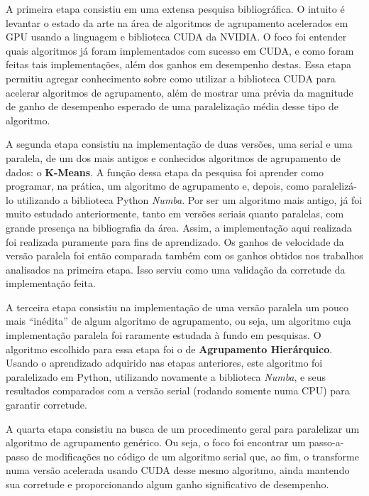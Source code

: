 \documentclass[12pt, %
openright, 
oneside, %
a4paper,    %
brazil]{facom-ufu-abntex2}
\begin{document}
A primeira etapa consistiu em uma extensa pesquisa bibliográfica. O intuito é levantar o estado da arte na área de algoritmos de agrupamento acelerados em GPU usando a linguagem e biblioteca CUDA da NVIDIA. O foco foi entender quais algoritmos já foram implementados com sucesso em CUDA, e como foram feitas tais implementações, além dos ganhos em desempenho destas. Essa etapa permitiu agregar conhecimento sobre como utilizar a biblioteca CUDA para acelerar algoritmos de agrupamento, além de mostrar uma prévia da magnitude de ganho de desempenho esperado de uma paralelização média desse tipo de algoritmo.

A segunda etapa consistiu na implementação de duas versões, uma serial e uma paralela, de um dos mais antigos e conhecidos algoritmos de agrupamento de dados: o \textbf{K-Means}. A função dessa etapa da pesquisa foi aprender como programar, na prática, um algoritmo de agrupamento e, depois, como paralelizá-lo utilizando a biblioteca Python \textit{Numba}. Por ser um algoritmo mais antigo, já foi muito estudado anteriormente, tanto em versões seriais quanto paralelas, com grande presença na bibliografia da área. Assim, a implementação aqui realizada foi realizada puramente para fins de aprendizado. Os ganhos de velocidade da versão paralela foi então comparada também com os ganhos obtidos nos trabalhos analisados na primeira etapa. Isso serviu como uma validação da corretude da implementação feita.

A terceira etapa consistiu na implementação de uma versão paralela um pouco mais \enquote{inédita} de algum algoritmo de agrupamento, ou seja, um algoritmo cuja implementação paralela foi raramente estudada à fundo em pesquisas. O algoritmo escolhido para essa etapa foi o de \textbf{Agrupamento Hierárquico}. Usando o aprendizado adquirido nas etapas anteriores, este algoritmo foi paralelizado em Python, utilizando novamente a biblioteca \textit{Numba}, e seus resultados comparados com a versão serial (rodando somente numa CPU) para garantir corretude.

A quarta etapa consistiu na busca de um procedimento geral para paralelizar um algoritmo de agrupamento genérico. Ou seja, o foco foi encontrar um passo-a-passo de modificações no código de um algoritmo serial que, ao fim, o transforme numa versão acelerada usando CUDA desse mesmo algoritmo, ainda mantendo sua corretude e proporcionando algum ganho significativo de desempenho.
\end{document}
